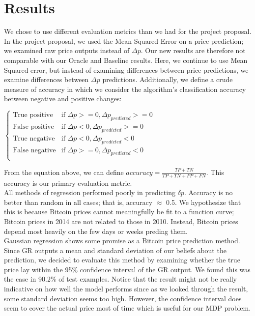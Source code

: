\documentclass[10pt]{article}
\begin{document}
\section*{ Results}
 We chose to use different evaluation metrics than we had for the project proposal. In the project proposal, we used the Mean Squared Error on a price prediction; we examined raw price outputs instead of $\Delta p$. Our new results are therefore not comparable with our Oracle and Baseline results.
 	Here, we continue to use Mean Squared error, but instead of examining differences between price predictions, we examine differences between $\Delta p$ predictions. Additionally, we define a crude measure of accuracy in which we consider the algorithm’s classification accuracy between negative and positive changes: 
 	
$ 	 \begin{cases} \text{True positive} &\mbox{if } \Delta p >= 0, \Delta p_{predicted} >= 0 \\ 
\text{False positive} &\mbox{if } \Delta p < 0, \Delta p_{predicted} >= 0 \\ 
\text{True negative} &\mbox{if } \Delta p < 0, \Delta p_{predicted} < 0 \\ 
\text{False negative} &\mbox{if } \Delta p >= 0, \Delta p_{predicted} < 0 \\ 
 	 \end{cases}$ 
 	
 	
 	From the equation above, we can define $accuracy = \frac{TP + TN}{TP + TN + FP + FN}$. This accuracy is our primary evaluation metric. \\
 	
 	All methods of regression performed poorly in predicting $\delta p$.  Accuracy is no better than random in all cases; that is, accuracy $\approx$ 0.5. We hypothesize that this is because Bitcoin prices cannot meaningfully be fit to a function curve; Bitcoin prices in 2014 are not related to those in 2010. Instead, Bitcoin prices depend most heavily on the few days or weeks preding them. \\
 	
 	Gaussian regression shows some promise as a Bitcoin price prediction method. Since GR outputs a mean and standard deviation of our beliefs about the prediction, we decided to evaluate this method by examining whether the true price lay within the 95\% confidence interval of the GR output. 	We found this was the case in 90.2\% of test examples. Notice that the result might not be really indicative on how well the model performs since as we looked through the result, some standard deviation seems too high. However, the confidence interval does seem to cover the actual price most of time which is useful for our MDP problem.\\
 	
\end{document}
